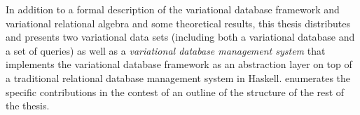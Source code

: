 In addition to a formal description of the variational database framework and
variational relational algebra and some theoretical results,
this thesis distributes and presents two variational data sets (including both a variational
database and a set of queries) as well as a \emph{variational database management system}
that implements the variational database framework as an abstraction layer on top of a 
traditional relational database management system in Haskell.
 enumerates the specific contributions in the contest of an outline
of the structure of the rest of the thesis. 








